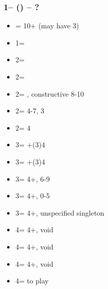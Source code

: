 \documentclass[12pt, a4paper]{article}
\begin{document}
\subsubsection*{1\spades -- (\dbl) -- ?}
\begin{itemize}
    \item \rdbl = 10+ (may have 3\spades)
    \item 1\nt = \trsf{ 2\clubs}
    \item 2\clubs = \trsf{2\diams}
    \item 2\diams = \trsf{2\hearts}
    \item 2\hearts = \trsf{2\spades}, constructive 8-10
    \item 2\spades = 4-7, 3\spades
    \item 2\nt = 4\spades \inv \vimp
    \item 3\clubs = \clubs+(3)4\spades \inv \vimp
    \item 3\diams = \diams+(3)4\spades \inv \vimp
    \item 3\hearts = 4+\spades, 6-9
    \item 3\spades = 4+\spades, 0-5 \hcp
    \item 3\nt =  4+\spades, unspecified singleton \vimp
    \item 4\clubs = 4+\spades, void \clubs
    \item 4\diams = 4+\spades, void \diams
    \item 4\hearts = 4+\spades, void \hearts
    \item 4\spades = to play
\end{itemize}

\end{document}
